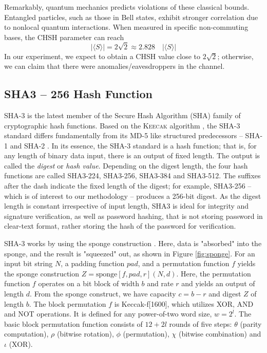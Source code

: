 \documentclass[a4paper]{cas-sc}
\begin{document}
Remarkably, quantum mechanics predicts violations of these classical bounds. Entangled particles, such as those in Bell states, exhibit stronger correlation due to nonlocal quantum interactions. When measured in specific non-commuting bases, the CHSH parameter can reach
\[
    \left| \langle S \rangle \right| = 2\sqrt{2} \approx 2.828 \quad \left| \langle S \rangle \right|
\]
In our experiment, we expect to obtain a CHSH value close to \( 2\sqrt{2} \); otherwise, we can claim that there were anomalies/eavesdroppers in the channel.
\subsection{SHA3 -- 256 Hash Function}
\label{sec:sha3}
SHA-3 is the latest member \cite{nistHashFunctions} of the Secure Hash Algorithm (SHA) family of cryptographic hash functions. Based on the K\textsc{eecak} algorithm \cite{Bbbbbbb2011}, the SHA-3 standard differs fundamentally from its MD-5 \cite{rivest1992md5} like structured predecessors -- SHA-1 and SHA-2 \cite{penard2008secure}. In its essence, the SHA-3 standard is a hash function; that is, for any length of binary data input, there is an output of fixed length. The output is called the \textit{digest} or \textit{hash value}. Depending on the digest length, the four hash functions are called SHA3-224, SHA3-256, SHA3-384 and SHA3-512. The suffixes after the dash indicate the fixed length of the digest; for example, SHA3-256 -- which is of interest to our methodology -- produces a 256-bit digest. As the digest length is constant irrespective of input length, SHA3 is ideal for integrity and signature verification, as well as password hashing, that is not storing password in clear-text format, rather storing the hash of the password for verification.

SHA-3 works by using the sponge construction \cite{keccakKeccakTeam}. Here, data is "absorbed" into the sponge, and the result is "squeezed" out, as shown in Figure \ref{fig:sponge}. For an input bit string $N$, a padding function $pad$, and a permutation function $f$ yields the sponge construction $Z=\text{sponge}[f,pad,r](N,d)$. Here, the permutation function $f$ operates on a bit block of width $b$ and rate $r$ and yields an output of length $d$. From the sponge construct, we have capacity $c=b-r$ and digest $Z$ of length $b$. The block permutation $f$ is Keccak-f[1600], which utilizes XOR, AND and NOT operations. It is defined for any power-of-two word size, $w=2^l$. The basic block permutation function consists of $12+2l$ rounds of five steps: $\theta$ (parity computation), $\rho$ (bitwise rotation), $\phi$ (permutation), $\chi$ (bitwise combination) and $\iota$ (XOR).
\end{document}
